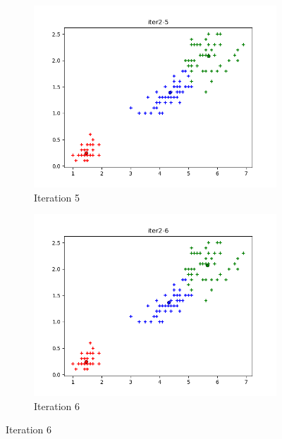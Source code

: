 \documentclass[french]{article}
\begin{document}
\newpage
\begin{figure}[h!]
\centering
\begin{subfigure}{.5\textwidth}
  \centering
  \includegraphics[width=\linewidth]{img/iter2-5.png}
  \caption{Iteration 5}
\end{subfigure}%
\begin{subfigure}{.5\textwidth}
  \centering
  \includegraphics[width=\linewidth]{img/iter2-6.png}
  \caption{Iteration 6}
\end{subfigure}%
\end{figure}
\end{document}
